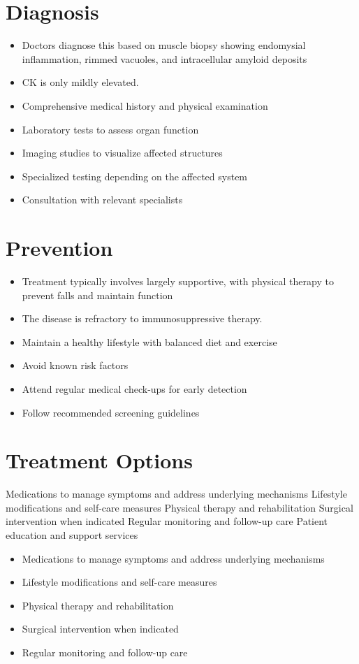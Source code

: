\section{Diagnosis}
\begin{itemize}[noitemsep]
  \item Doctors diagnose this based on muscle biopsy showing endomysial inflammation, rimmed vacuoles, and intracellular amyloid deposits
  \item CK is only mildly elevated.
  \item Comprehensive medical history and physical examination
  \item Laboratory tests to assess organ function
  \item Imaging studies to visualize affected structures
  \item Specialized testing depending on the affected system
  \item Consultation with relevant specialists
\end{itemize}
\section{Prevention}
\begin{itemize}[noitemsep]
  \item Treatment typically involves largely supportive, with physical therapy to prevent falls and maintain function
  \item The disease is refractory to immunosuppressive therapy.
  \item Maintain a healthy lifestyle with balanced diet and exercise
  \item Avoid known risk factors
  \item Attend regular medical check-ups for early detection
  \item Follow recommended screening guidelines
\end{itemize}
\section{Treatment Options}
Medications to manage symptoms and address underlying mechanisms Lifestyle modifications and self-care measures Physical therapy and rehabilitation Surgical intervention when indicated Regular monitoring and follow-up care Patient education and support services

\begin{itemize}[noitemsep]
  \item Medications to manage symptoms and address underlying mechanisms
  \item Lifestyle modifications and self-care measures
  \item Physical therapy and rehabilitation
  \item Surgical intervention when indicated
  \item Regular monitoring and follow-up care
\end{itemize}
